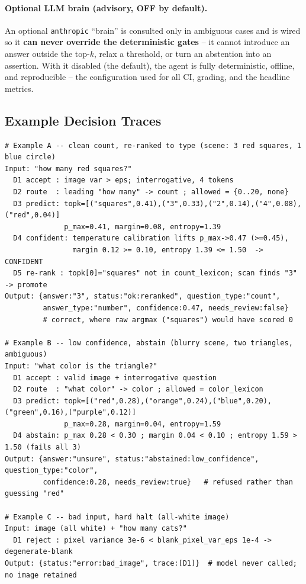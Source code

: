 \documentclass[12pt,a4paper]{article}
\begin{document}
\paragraph{Optional LLM brain (advisory, OFF by default).} An optional \texttt{anthropic} ``brain'' is consulted only in ambiguous cases and is wired so it \textbf{can never override the deterministic gates} -- it cannot introduce an answer outside the top-$k$, relax a threshold, or turn an abstention into an assertion. With it disabled (the default), the agent is fully deterministic, offline, and reproducible -- the configuration used for all CI, grading, and the headline metrics.

\subsection{Example Decision Traces}

\begin{lstlisting}
# Example A -- clean count, re-ranked to type (scene: 3 red squares, 1 blue circle)
Input: "how many red squares?"
  D1 accept : image var > eps; interrogative, 4 tokens
  D2 route  : leading "how many" -> count ; allowed = {0..20, none}
  D3 predict: topk=[("squares",0.41),("3",0.33),("2",0.14),("4",0.08),("red",0.04)]
              p_max=0.41, margin=0.08, entropy=1.39
  D4 confident: temperature calibration lifts p_max->0.47 (>=0.45),
                margin 0.12 >= 0.10, entropy 1.39 <= 1.50  -> CONFIDENT
  D5 re-rank : topk[0]="squares" not in count_lexicon; scan finds "3" -> promote
Output: {answer:"3", status:"ok:reranked", question_type:"count",
         answer_type:"number", confidence:0.47, needs_review:false}
         # correct, where raw argmax ("squares") would have scored 0

# Example B -- low confidence, abstain (blurry scene, two triangles, ambiguous)
Input: "what color is the triangle?"
  D1 accept : valid image + interrogative question
  D2 route  : "what color" -> color ; allowed = color_lexicon
  D3 predict: topk=[("red",0.28),("orange",0.24),("blue",0.20),("green",0.16),("purple",0.12)]
              p_max=0.28, margin=0.04, entropy=1.59
  D4 abstain: p_max 0.28 < 0.30 ; margin 0.04 < 0.10 ; entropy 1.59 > 1.50 (fails all 3)
Output: {answer:"unsure", status:"abstained:low_confidence", question_type:"color",
         confidence:0.28, needs_review:true}   # refused rather than guessing "red"

# Example C -- bad input, hard halt (all-white image)
Input: image (all white) + "how many cats?"
  D1 reject : pixel variance 3e-6 < blank_pixel_var_eps 1e-4 -> degenerate-blank
Output: {status:"error:bad_image", trace:[D1]}  # model never called; no image retained
\end{lstlisting}
\end{document}
